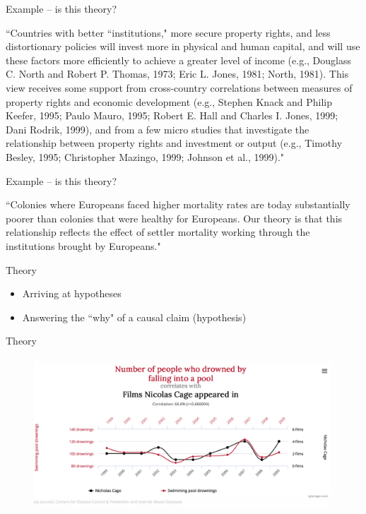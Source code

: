 \documentclass{beamer}
\begin{document}
\begin{frame}{Example -- is this theory?} 

	``Countries with better ``institutions," more secure property rights,
	and less distortionary policies will invest more in physical and human
	capital, and will use these factors more efficiently to achieve a
	greater level of income (e.g., Douglass C. North and Robert P. Thomas,
	1973; Eric L. Jones, 1981; North, 1981). This view receives some support
	from cross-country correlations between measures of property rights and
	economic development (e.g., Stephen Knack and Philip Keefer, 1995; Paulo
	Mauro, 1995; Robert E. Hall and Charles I. Jones, 1999; Dani Rodrik,
	1999), and from a few micro studies that investigate the relationship
between property rights and investment or output (e.g., Timothy Besley, 1995;
Christopher Mazingo, 1999; Johnson et al., 1999)." \end{frame}{}

\begin{frame}{Example -- is this theory?} 

	``Colonies where Europeans faced higher mortality rates are today
substantially poorer than colonies that were healthy for Europeans. Our theory
is that this relationship reflects the effect of settler mortality working
through the institutions brought by Europeans." \end{frame}

\begin{frame}{Theory}

    \begin{itemize}[<+- | alert@+>]
	
		\item Arriving at hypotheses
		\item Answering the ``why" of a causal claim
			(hypothesis)
	
	\end{itemize}

\end{frame}

\begin{frame}{Theory}

	\begin{figure}[!htb]
		\includegraphics[width=\textwidth,keepaspectratio]{../img/correlationCausation.png}
	\end{figure}
	
\end{frame}
\end{document}

